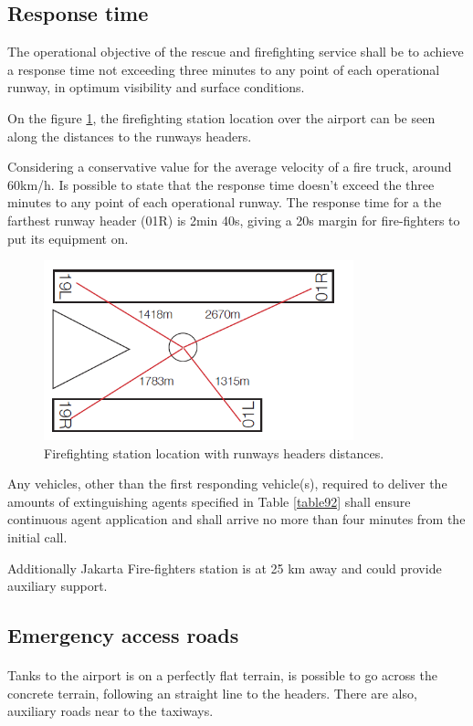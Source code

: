 		\subsection{Response time}
		The operational objective of the rescue and firefighting service shall be to achieve a response time not exceeding three minutes to any point of each operational runway, in optimum visibility and surface conditions.
		
		On the figure \ref{schemeFire}, the firefighting station location over the airport can be seen along the distances to the runways headers.
		
		Considering a conservative value for the average velocity of a fire truck, around 60km/h. Is possible to state that the response time doesn't exceed the three minutes to any point of each operational runway. The response time for a the farthest runway header (01R) is 2min 40s, giving a 20s margin for fire-fighters to put its equipment on. 
		\begin{figure}[H]
			\centering
			\includegraphics[clip, trim=0cm 0cm 0cm 0cm, width=0.8\textwidth]{./images/firefighting/schemeFire}
			\caption{Firefighting station location with runways headers distances.}
			\label{schemeFire}
		\end{figure}
		
		Any vehicles, other than the first responding vehicle(s), required to deliver the amounts of extinguishing agents specified in Table \ref{table92} shall ensure continuous agent application and shall arrive no more than four minutes from the initial call.
		
		Additionally Jakarta Fire-fighters station is at 25 km away and could provide auxiliary support.
		
		\subsection{Emergency access roads}
		\paragraph{} Tanks to the airport is on a perfectly flat terrain, is possible to go across the concrete terrain, following an straight line to the headers. There are also, auxiliary roads near to the taxiways.
		
